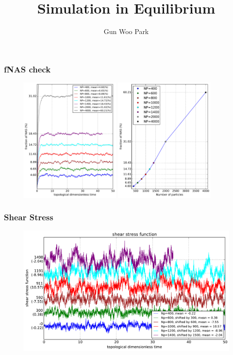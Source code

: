 \documentclass[slidestop, compress, mathserif]{beamer}
\title{Simulation in Equilibrium}
\author{Gun Woo Park}
\begin{document}
\begin{frame}[plain]
\maketitle
\end{frame}


\begin{frame}
  \frametitle<presentation>{fNAS check}
  \begin{figure}
    \centering
    \includegraphics[width=0.45\textwidth]{../check_fNAS.pdf}
    \includegraphics[width=0.45\textwidth]{../check_fNAS_NP.pdf}
  \end{figure}
\end{frame}

\begin{frame}
  \frametitle<presentation>{Shear Stress}
  \begin{figure}
    \centering
    \includegraphics[width=\textwidth]{../shear_stress_function.pdf}
  \end{figure}
\end{frame}
\end{document}
